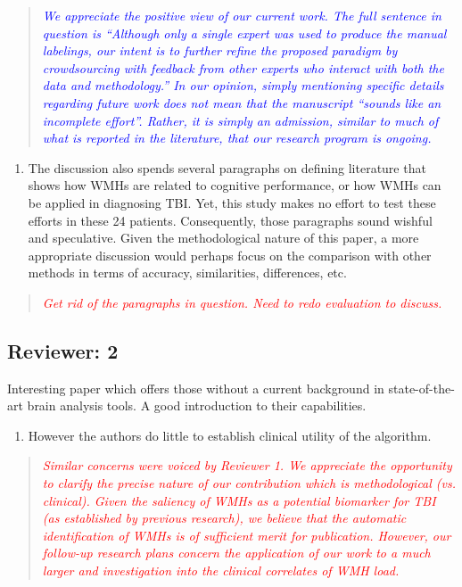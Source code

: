 \documentclass[12pt,]{article}
\providecommand{\tightlist}{%
  \setlength{\itemsep}{0pt}\setlength{\parskip}{0pt}}
\begin{document}
\begin{quote}
\emph{\textcolor{blue}{We appreciate the positive view of our current work.
The full sentence in question is ``Although only a
single expert was used to produce the manual labelings, our intent is to
further refine the proposed paradigm by crowdsourcing with feedback from
other experts who interact with both the data and methodology.''
In our opinion, simply mentioning specific details regarding future work
does not mean that the manuscript ``sounds like an incomplete effort''.
Rather, it is simply an admission, similar to much of what is reported
in the literature, that our research program is ongoing.}}
\end{quote}

\begin{enumerate}
\def\labelenumi{\arabic{enumi}.}
\setcounter{enumi}{14}
\tightlist
\item
  The discussion also spends several paragraphs on defining literature
  that shows how WMHs are related to cognitive performance, or how WMHs
  can be applied in diagnosing TBI. Yet, this study makes no effort to
  test these efforts in these 24 patients. Consequently, those
  paragraphs sound wishful and speculative. Given the methodological
  nature of this paper, a more appropriate discussion would perhaps
  focus on the comparison with other methods in terms of accuracy,
  similarities, differences, etc.
\end{enumerate}

\begin{quote}
\emph{\textcolor{red}{Get rid of the paragraphs in question.  Need to redo evaluation
to discuss.}}
\end{quote}

\subsection{Reviewer: 2}\label{reviewer-2}

Interesting paper which offers those without a current background in
state-of-the-art brain analysis tools. A good introduction to their
capabilities.

\begin{enumerate}
\def\labelenumi{\arabic{enumi}.}
\tightlist
\item
  However the authors do little to establish clinical utility of the
  algorithm.
\end{enumerate}

\begin{quote}
\emph{\textcolor{red}{Similar concerns were voiced by Reviewer 1.  We appreciate
the opportunity to clarify the precise nature of our contribution which is methodological
(vs. clinical).  Given the saliency of WMHs as a potential biomarker for TBI
(as established by previous research), we believe that the automatic identification
of WMHs is of sufficient merit for publication.  However, our follow-up research plans
concern the application of our work to a much larger and investigation into the clinical
correlates of WMH load.}}
\end{quote}
\end{document}
